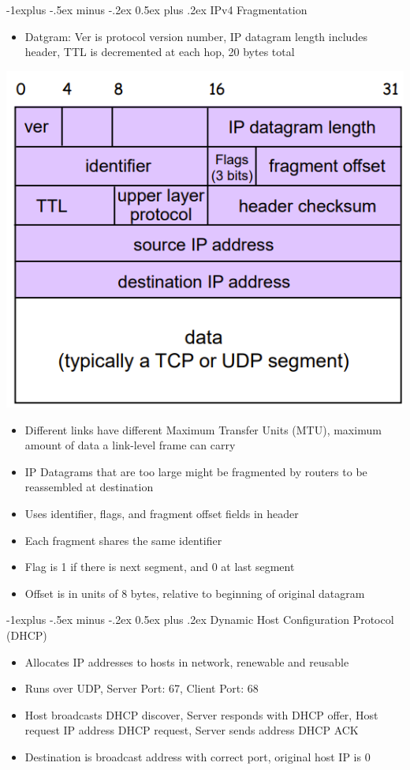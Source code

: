 \documentclass[10pt, landscape]{article}
\makeatletter
\renewcommand{\section}{\@startsection{section}{1}{0mm}%
                                {-1ex plus -.5ex minus -.2ex}%
                                {0.5ex plus .2ex}%
                                {\normalfont\large\bfseries}}
\renewcommand{\section}{\@startsection{section}{2}{0mm}%
                                {-1explus -.5ex minus -.2ex}%
                                {0.5ex plus .2ex}%
                                {\normalfont\normalsize\bfseries}}
\makeatother
\begin{document}
\begin{multicols*}{3}
\section{IPv4 Fragmentation}
\begin{itemize}
    \item Datgram: Ver is protocol version number, IP datagram length includes header, TTL is decremented at each hop, 20 bytes total
\end{itemize}
\begin{center}
    \includegraphics[width=0.9\linewidth]{IP.png}
\end{center}
\begin{itemize}
    \item Different links have different Maximum Transfer Units (MTU), maximum amount of data a link-level frame can carry
    \item IP Datagrams that are too large might be fragmented by routers to be reassembled at destination
    \item Uses identifier, flags, and fragment offset fields in header
    \item Each fragment shares the same identifier
    \item Flag is 1 if there is next segment, and 0 at last segment
    \item Offset is in units of 8 bytes, relative to beginning of original datagram
\end{itemize}

\section{Dynamic Host Configuration Protocol (DHCP)}
\begin{itemize}
    \item Allocates IP addresses to hosts in network, renewable and reusable
    \item Runs over UDP, Server Port: 67, Client Port: 68
    \item Host broadcasts DHCP discover, Server responds with DHCP offer, Host request IP address DHCP request, Server sends address DHCP ACK
    \item Destination is broadcast address with correct port, original host IP is 0
\end{itemize}


\end{multicols*}
\end{document}
